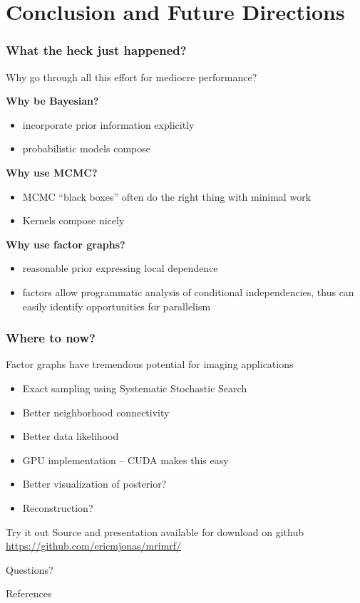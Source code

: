 \documentclass[compress]{beamer}
\begin{document}
\section{Conclusion and Future Directions}
\frame{\tableofcontents[currentsection]}

\begin{frame}
  \frametitle{What the heck just happened?}
  Why go through all this effort for mediocre performance? 

  \pause

  \textbf{Why be Bayesian?  }
  \pause
  \begin{itemize}[<+->]
  \item incorporate prior information explicitly
  \item probabilistic models compose
  \end{itemize}
  \pause
  \textbf { Why use MCMC? }
  \pause
  
  \begin{itemize}[<+->]
    \item  MCMC ``black boxes'' often do the right thing with minimal work
    \item Kernels compose nicely \cite{bonawitz_composable_2008}
  \end{itemize}
  \pause
  \textbf{Why use factor graphs? }
  \pause
  \begin{itemize}[<+->]
  \item reasonable prior expressing local dependence 
  \item factors allow programmatic analysis of conditional independencies, 
    thus can easily identify opportunities for parallelism
  \end{itemize}

\end{frame}

\begin{frame}
  \frametitle{Where to now?}
  
  Factor graphs have tremendous potential for imaging applications

  \begin{itemize}[<+->]
  \item Exact sampling using Systematic Stochastic Search \cite{mansinghka_systematic_2009}
  \item Better neighborhood connectivity
  \item Better data likelihood
  \item GPU implementation -- CUDA makes this easy 
  \item Better visualization of posterior?
  \item Reconstruction? 
  \end{itemize}
  
  \pause
  \begin{block}{Try it out}
    Source and presentation available for download on github
    \url{https://github.com/ericmjonas/mrimrf/}
  \end{block}

  \pause
  Questions? 

\end{frame}



\begin{frame}[allowframebreaks]{References}

\end{frame} 
\end{document}
